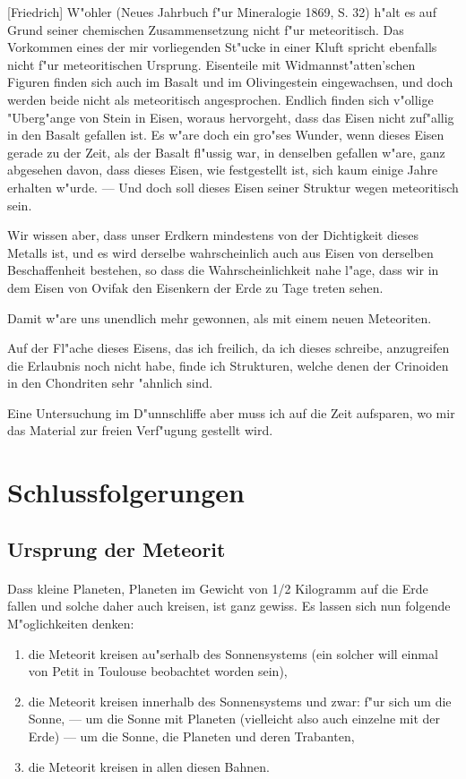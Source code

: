 \documentclass[a4paper, 11pt, oneside]{article}
\begin{document}
[Friedrich] W"ohler (Neues Jahrbuch f"ur Mineralogie 1869, S. 32) h"alt es auf Grund seiner chemischen Zusammensetzung nicht f"ur meteoritisch. Das Vorkommen eines der mir vorliegenden St"ucke in einer Kluft spricht ebenfalls nicht f"ur meteoritischen Ursprung. Eisenteile mit Widmannst"atten'schen Figuren finden sich auch im Basalt und im Olivingestein eingewachsen, und doch werden beide nicht als meteoritisch angesprochen. Endlich finden sich v"ollige "Uberg"ange von Stein in Eisen, woraus hervorgeht, dass das Eisen nicht zuf"allig in den Basalt gefallen ist. Es w"are doch ein gro"ses Wunder, wenn dieses Eisen gerade zu der Zeit, als der Basalt fl"ussig war, in denselben gefallen w"are, ganz abgesehen davon, dass dieses Eisen, wie festgestellt ist, sich kaum einige Jahre erhalten w"urde. --- Und doch soll dieses Eisen seiner Struktur wegen meteoritisch sein.

Wir wissen aber, dass unser Erdkern mindestens von der Dichtigkeit dieses Metalls ist, und es wird derselbe wahrscheinlich auch aus Eisen von derselben Beschaffenheit bestehen, so dass die Wahrscheinlichkeit nahe l"age, dass wir in dem Eisen von Ovifak den Eisenkern der Erde zu Tage treten sehen.

Damit w"are uns unendlich mehr gewonnen, als mit einem neuen Meteoriten.

Auf der Fl"ache dieses Eisens, das ich freilich, da ich dieses schreibe, anzugreifen die Erlaubnis noch nicht habe, finde ich Strukturen, welche denen der Crinoiden in den Chondriten sehr "ahnlich sind.

Eine Untersuchung im D"unnschliffe aber muss ich auf die Zeit aufsparen, wo mir das Material zur freien Verf"ugung gestellt wird.
\clearpage
\section{Schlussfolgerungen}
\subsection{Ursprung der Meteorit}
\paragraph{}
Dass kleine Planeten, Planeten im Gewicht von 1/2 Kilogramm auf die Erde fallen und solche daher auch kreisen, ist ganz gewiss. Es lassen sich nun folgende M"oglichkeiten denken:
\begin{enumerate}
\item die Meteorit kreisen au"serhalb des Sonnensystems (ein solcher will einmal von Petit in Toulouse beobachtet worden sein),
\item die Meteorit kreisen innerhalb des Sonnensystems und zwar: f"ur sich um die Sonne, --- um die Sonne mit Planeten (vielleicht also auch einzelne mit der Erde) --- um die Sonne, die Planeten und deren Trabanten,
\item die Meteorit kreisen in allen diesen Bahnen.
\end{enumerate}
\end{document}
